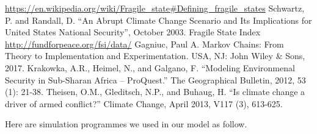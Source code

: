 \documentclass{mcmthesis}
\begin{document}
	\newpage
	\begin{thebibliography}{99}
		\url{https://en.wikipedia.org/wiki/Fragile_state#Defining_fragile_states}
		 Schwartz, P. and Randall, D. “An Abrupt Climate Change Scenario and Its Implications for United States National Security”, October 2003.
		 Fragile State Index \url{http://fundforpeace.org/fsi/data/}
		 Gagniuc, Paul A. Markov Chains: From Theory to Implementation and Experimentation. USA, NJ: John Wiley \& Sons, 2017.
		 Krakowka, A.R., Heimel, N., and Galgano, F. “Modeling Environmenal Security in Sub-Sharan Africa – ProQuest.” The Geographical Bulletin, 2012, 53 (1): 21-38.
		 Theisen, O.M., Gleditsch, N.P., and Buhaug, H. “Is climate change a driver of armed conflict?” Climate Change, April 2013, V117 (3), 613-625.
	\end{thebibliography}
	
	\begin{appendices}
		
		Here are simulation programmes we used in our model as follow.
		
		
		
		
		
		
		
		
		
		
%		
	\end{appendices}
\end{document}
